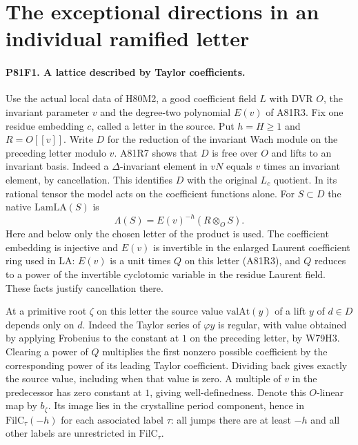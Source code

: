 \section{The exceptional directions in an individual ramified letter}

\paragraph{P81F1. A lattice described by Taylor coefficients.}
Use the actual local data of H80M2, a good coefficient field $L$
with DVR $O$, the invariant parameter $v$ and the degree-two
polynomial $E(v)$ of A81R3. Fix one residue embedding $c$, called
a letter in the source. Put $h=H\ge1$ and $R=O[[v]]$.
Write $D$ for the reduction of the invariant Wach module on the
preceding letter modulo $v$. A81R7 shows that $D$ is free over
$O$ and lifts to an invariant basis. Indeed a $\Delta$-invariant
element in $vN$ equals $v$ times an invariant element, by
cancellation. This identifies $D$ with the original $L_c$ quotient.
In its rational tensor the model acts on the coefficient functions
alone. For $S\subset D$ the native $\mathrm{LamLA}(S)$ is
\[
              \Lambda(S)=E(v)^{-h}(R\otimes_O S).
\]
Here and below only the chosen letter of the product is used.
The coefficient embedding is injective and $E(v)$ is invertible
in the enlarged Laurent coefficient ring used in $\mathrm{LA}$:
$E(v)$ is a unit times $Q$ on this letter (A81R3), and $Q$
reduces to a power of the invertible cyclotomic variable in the
residue Laurent field. These facts justify cancellation there.

At a primitive root $\zeta$ on this letter the source value
$\mathrm{valAt}(y)$ of a lift $y$ of $d\in D$ depends only on
$d$. Indeed the Taylor series of $\varphi y$ is regular, with
value obtained by applying Frobenius to the constant at $1$ on
the preceding letter, by W79H3. Clearing a power of $Q$ multiplies
the first nonzero possible coefficient by the corresponding power
of its leading Taylor coefficient. Dividing back gives exactly
the source value, including when that value is zero. A multiple
of $v$ in the predecessor has zero constant at $1$, giving
well-definedness. Denote this $O$-linear map by $b_\zeta$.
Its image lies in the crystalline period component, hence in
$\mathrm{FilC}_\tau(-h)$ for each associated label $\tau$:
all jumps there are at least $-h$ and all other labels are
unrestricted in $\mathrm{FilC}_\tau$.

